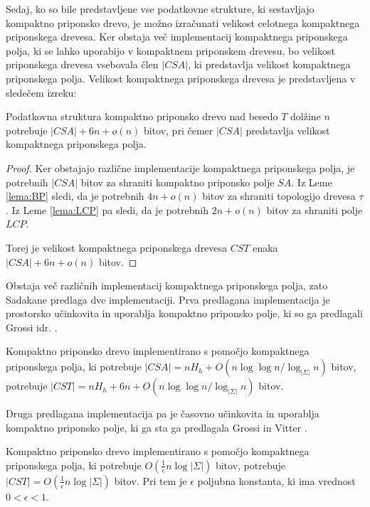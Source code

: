 Sedaj, ko so bile predstavljene vse podatkovne strukture, ki sestavljajo kompaktno priponsko drevo, je možno izračunati velikost celotnega kompaktnega priponskega drevesa. Ker obstaja več implementacij kompaktnega priponskega polja, ki se lahko uporabijo v kompaktnem priponskem drevesu, bo velikost priponskega drevesa vsebovala člen $|CSA|$, ki predstavlja velikost kompaktnega priponskega polja. Velikost kompaktnega priponskega drevesa je predstavljena v sledečem izreku:

\begin{izr}
    Podatkovna struktura kompaktno priponsko drevo nad besedo $T$ dolžine $n$ potrebuje $|CSA|+6n+o(n)$ bitov, pri čemer $|CSA|$ predstavlja velikost kompaktnega priponskega polja.
\end{izr}
\begin{proof}
    Ker obstajajo različne implementacije kompaktnega priponskega polja, je potrebnih $|CSA|$ bitov za shraniti kompaktno priponsko polje $SA$. Iz Leme \ref{lema:BP} sledi, da je potrebnih $4n+o(n)$ bitov za shraniti topologijo drevesa $\tau$. Iz Leme \ref{lema:LCP} pa sledi, da je potrebnih $2n+o(n)$ bitov za shraniti polje $LCP$.

    Torej je velikost kompaktnega priponskega drevesa $CST$ enaka $|CSA|+6n+o(n)$ bitov.
\end{proof}

Obstaja več različnih implementacij kompaktnega priponskega polja, zato Sadakane \cite{Sadakane2007} predlaga dve implementaciji. Prva predlagana implementacija je prostorsko učinkovita in uporablja kompaktno priponsko polje, ki so ga predlagali Grossi idr. \cite{Grossi2003}. 

\begin{posl}\label{pos:CSAnh}
Kompaktno priponsko drevo implementirano s pomočjo kompaktnega priponskega polja, ki potrebuje $|CSA|=nH_h+O(n\log\log{n} / \log_{| \Sigma|}{n})$ bitov, potrebuje $|CST|= nH_h+6n+O(n\log\log{n} / \log_{| \Sigma|}{n})$ bitov.    
\end{posl}

Druga predlagana implementacija pa je časovno učinkovita in uporablja kompaktno priponsko polje, ki ga sta ga predlagala Grossi in Vitter \cite{Grossi2000}. 
\begin{posl}\label{pos:CSAlog}
Kompaktno priponsko drevo implementirano s pomočjo kompaktnega priponskega polja, ki potrebuje $O(\frac{1}{\epsilon}n\log{| \Sigma|})$ bitov, potrebuje $|CST|=O(\frac{1}{\epsilon}n\log{| \Sigma|})$ bitov. Pri tem je $\epsilon$ poljubna konstanta, ki ima vrednost $0<\epsilon<1$.
\end{posl}

